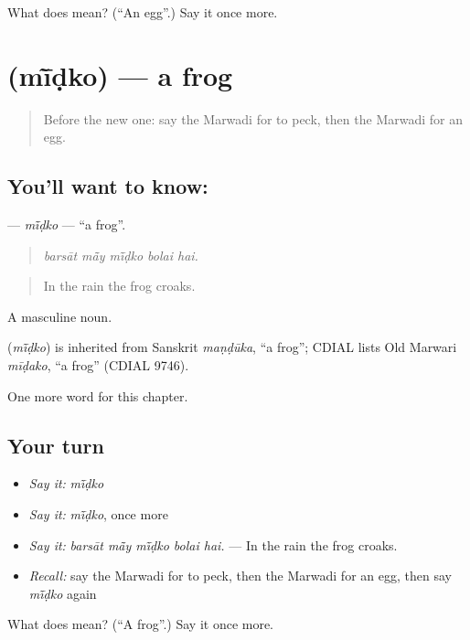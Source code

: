 \begin{tcolorbox}[breakable,colback=teal!4,colframe=teal!35!black,title={Before you move on}]
What does  mean? (\textquotedblleft{}An egg\textquotedblright{}.) Say it once more.
\end{tcolorbox}
\section[\texorpdfstring{\mw{मींडको} (mī̃ḍko)}{मींडको (mī̃ḍko)}]{ (mī̃ḍko) — a frog}

\label{lesson:MW-C237-midko}



\begin{quote}
Before the new one: say the Marwadi for to peck, then the Marwadi for an egg.
\end{quote}

\subsection*{You'll want to know: }
\textbf{} — \emph{mī̃ḍko} — \textquotedblleft{}a frog\textquotedblright{}.

\begin{quote}
    
\end{quote}

\begin{quote}
\emph{barsāt mā̃y mī̃ḍko bolai hai.}
\end{quote}

\begin{quote}
In the rain the frog croaks.
\end{quote}

A masculine noun.

\begin{cousinweb}
\textbf{} (\emph{mī̃ḍko}) is inherited from Sanskrit \emph{maṇḍūka}, \textquotedblleft{}a frog\textquotedblright{}; CDIAL lists Old Marwari \emph{mīḍako}, \textquotedblleft{}a frog\textquotedblright{} (CDIAL 9746).
\end{cousinweb}

\begin{grammarlens}[title={What you've built}]
One more word for this chapter.
\end{grammarlens}

\subsection*{Your turn}
\begin{itemize}
\raggedright
  \item \emph{Say it:} \emph{mī̃ḍko}
  \item \emph{Say it:} \emph{mī̃ḍko}, once more
  \item \emph{Say it:} \emph{barsāt mā̃y mī̃ḍko bolai hai.} — In the rain the frog croaks.
  \item \emph{Recall:} say the Marwadi for to peck, then the Marwadi for an egg, then say \emph{mī̃ḍko} again
\end{itemize}

\begin{tcolorbox}[breakable,colback=teal!4,colframe=teal!35!black,title={Before you move on}]
What does  mean? (\textquotedblleft{}A frog\textquotedblright{}.) Say it once more.
\end{tcolorbox}
